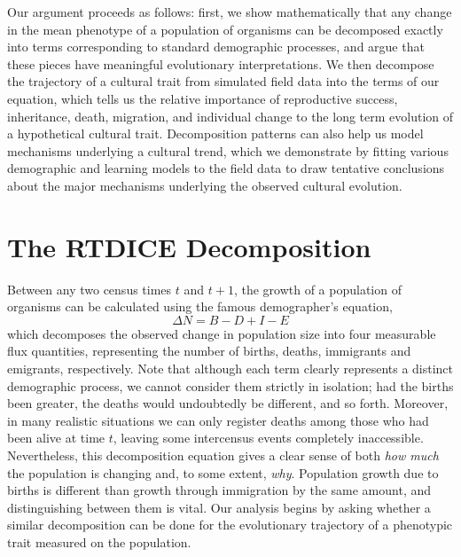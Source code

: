 \documentclass[11pt]{article}
\begin{document}
Our argument proceeds as follows: first, we show mathematically that any change in the mean phenotype of a population of organisms can be decomposed exactly into terms corresponding to standard demographic processes, and argue that these pieces have meaningful evolutionary interpretations. We then decompose the trajectory of a cultural trait from simulated field data into the terms of our equation, which tells us the relative importance of reproductive success, inheritance, death, migration, and individual change to the long term evolution of a hypothetical cultural trait.  Decomposition patterns can also help us model mechanisms underlying a cultural trend, which we demonstrate by fitting various demographic and learning models to the field data to draw tentative conclusions about the major mechanisms underlying the observed cultural evolution.  

\section{The RTDICE Decomposition}

Between any two census times $t$ and $t+1$, the growth of a population of organisms can be calculated using the famous demographer's equation,
\begin{equation} \label{eq:demo}
\Delta N = B - D + I - E
\end{equation}
which decomposes the observed change in population size into four measurable flux quantities, representing the number of births, deaths, immigrants and emigrants, respectively.  Note that although each term clearly represents a distinct demographic process, we cannot consider them strictly in isolation; had the births been greater, the deaths would undoubtedly be different, and so forth.  Moreover, in many realistic situations we can only register deaths among those who had been alive at time $t$, leaving some intercensus events completely inaccessible.  Nevertheless, this decomposition equation gives a clear sense of both \textit{how much} the population is changing and, to some extent, \textit{why}.  Population growth due to births is different than growth through immigration by the same amount, and distinguishing between them is vital.  Our analysis begins by asking whether a similar decomposition can be done for the evolutionary trajectory of a phenotypic trait measured on the population.
\end{document}
